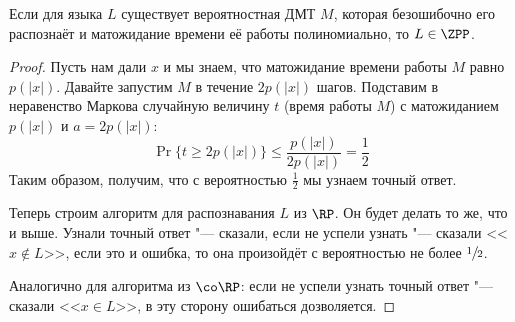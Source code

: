 	\begin{theorem}
		Если для языка $L$ существует вероятностная ДМТ $M$, которая безошибочно его распознаёт и матожидание времени её работы полиномиально,
		то $L \in \ZPP$.
	\end{theorem}
	\begin{proof}
		Пусть нам дали $x$ и мы знаем, что матожидание времени работы $M$ равно $p(|x|)$.
		Давайте запустим $M$ в течение $2p(|x|)$ шагов.
		Подставим в неравенство Маркова случайную величину $t$ (время работы $M$) с матожиданием $p(|x|)$ и $a=2p(|x|)$:
		\[
			\Pr \{ t \ge 2p(|x|) \} \le \frac{p(|x|)}{2p(|x|)} = \frac 12
		\]
		Таким образом, получим, что с вероятностью $\frac 12$ мы узнаем точный ответ.

		Теперь строим алгоритм для распознавания $L$ из $\RP$.
		Он будет делать то же, что и выше.
		Узнали точный ответ "--- сказали, если не успели узнать "--- сказали <<$x \notin L$>>, если это и ошибка, то она произойдёт с вероятностью не более $\sfrac 12$.

		Аналогично для алгоритма из $\co\RP$: если не успели узнать точный ответ "--- сказали <<$x \in L$>>, в эту сторону ошибаться дозволяется.
	\end{proof}
